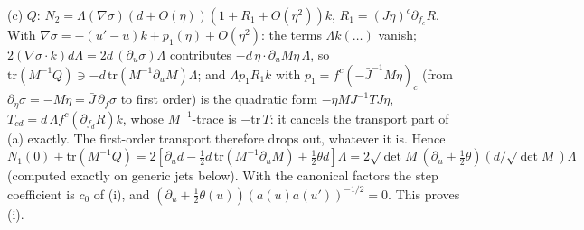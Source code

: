 (c) $Q$: $N_{2} = \Lambda(\nabla\sigma)(d + O(\eta))(1 + R_{1} + O(\eta^{2}))k$, $R_{1} = (J\eta)^{c}\partial_{f_{c}}R$. With $\nabla\sigma = -(u' - u)k + p_{1}(\eta) + O(\eta^{2})$: the terms $\Lambda k(\ldots)$ vanish; $2(\nabla\sigma\cdot k)d\Lambda = 2d\,(\partial_{u}\sigma)\Lambda$ contributes $-d\,\eta\cdot\partial_{u}M\eta\,\Lambda$, so $\mathrm{tr}(M^{-1}Q) \ni -d\,\mathrm{tr}(M^{-1}\partial_{u}M)\Lambda$; and $\Lambda p_{1}R_{1}k$ with $p_{1} = f^{c}(-\bar J^{-1}M\eta)_{c}$ (from $\partial_{\eta}\sigma = -M\eta = \bar J\,\partial_{f}\sigma$ to first order) is the quadratic form $-\bar\eta MJ^{-1}TJ\eta$, $T_{cd} = d\,\Lambda f^{c}(\partial_{f_{d}}R)k$, whose $M^{-1}$-trace is $-\mathrm{tr}\,T$: it cancels the transport part of (a) exactly. The first-order transport therefore drops out, whatever it is.
Hence $N_{1}(0) + \mathrm{tr}(M^{-1}Q) = 2[\partial_{u}d - \tfrac12 d\,\mathrm{tr}(M^{-1}\partial_{u}M) + \tfrac12\theta d]\Lambda = 2\sqrt{\det M}(\partial_{u} + \tfrac12\theta)(d/\sqrt{\det M})\Lambda$ (computed exactly on generic jets below). With the canonical factors the step coefficient is $c_{0}$ of (i), and $(\partial_{u} + \tfrac12\theta(u))(a(u)a(u'))^{-1/2} = 0$. This proves (i).

